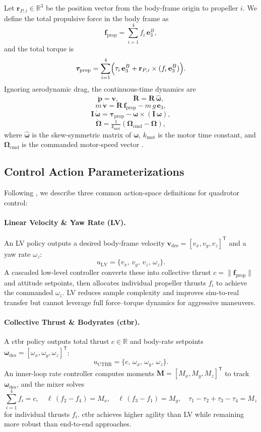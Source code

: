 Let \(\mathbf{r}_{P,i}\in \mathbb{R}^{3}\) be the position vector from the body-frame origin to propeller \(i\). We define the total propulsive force in the body frame as
\[
\mathbf{f}_{\mathrm{prop}} = \sum_{i=1}^4 f_i\,\mathbf{e}_3^B,
\]
and the total torque is
\[
\boldsymbol{\tau}_{\mathrm{prop}} = \sum_{i=1}^4 \Bigl(\tau_i\,\mathbf{e}_3^B + \mathbf{r}_{P,i}\times(f_i\,\mathbf{e}_3^B)\Bigr).
\]
Ignoring aerodynamic drag, the continuous-time dynamics are
\[
\dot{\mathbf{p}} = \mathbf{v}, 
\qquad
\dot{\mathbf{R}} = \mathbf{R}\,\widehat{\boldsymbol{\omega}},
\]
\[
m\,\dot{\mathbf{v}} = \mathbf{R}\,\mathbf{f}_{\mathrm{prop}} - m\,g\,\mathbf{e}_3,
\]
\[
\mathbf{I}\,\dot{\boldsymbol{\omega}} = \boldsymbol{\tau}_{\mathrm{prop}} - \boldsymbol{\omega} \times (\mathbf{I}\,\boldsymbol{\omega}),
\]
\[
\dot{\boldsymbol{\Omega}} = \tfrac{1}{k_{\mathrm{mot}}}(\boldsymbol{\Omega}_{\mathrm{cmd}} - \boldsymbol{\Omega}),
\]
where \(\widehat{\boldsymbol{\omega}}\) is the skew-symmetric matrix of \(\boldsymbol{\omega}\), \(k_{\mathrm{mot}}\) is the motor time constant, and \(\boldsymbol{\Omega}_{\mathrm{cmd}}\) is the commanded motor-speed vector \cite{kaufmann_benchmark_2022}.

\subsection{Control Action Parameterizations}
\label{sec:quadrotor_actions}
Following \cite{kaufmann_benchmark_2022}, we describe three common action-space definitions for quadrotor control:

\paragraph{Linear Velocity \& Yaw Rate (LV).}  
An LV policy outputs a desired body-frame velocity \(\mathbf{v}_{\mathrm{des}}=[v_x,v_y,v_z]^\mathsf{T}\) and a yaw rate \(\omega_z\):
\[
u_{\mathrm{LV}} = \{v_x,\,v_y,\,v_z,\,\omega_z\}.
\]
A cascaded low-level controller converts these into collective thrust \(c=\|\mathbf{f}_{\mathrm{prop}}\|\) and attitude setpoints, then allocates individual propeller thrusts \(f_i\) to achieve the commanded \(\omega_z\). LV reduces sample complexity and improves sim-to-real transfer but cannot leverage full force–torque dynamics for aggressive maneuvers.

\paragraph{Collective Thrust \& Bodyrates (\gls{ctbr}).}  
A \gls{ctbr} policy outputs total thrust \(c\in\mathbb{R}\) and body-rate setpoints \(\boldsymbol{\omega}_{\mathrm{des}}=[\omega_x,\omega_y,\omega_z]^\mathsf{T}\):
\[
u_{\mathrm{CTBR}} = \{c,\,\omega_x,\,\omega_y,\,\omega_z\}.
\]
An inner-loop rate controller computes moments \(\mathbf{M}=[M_x,M_y,M_z]^\mathsf{T}\) to track \(\boldsymbol{\omega}_{\mathrm{des}}\), and the mixer solves
\[
\sum_{i=1}^4 f_i = c, 
\quad
\ell\,(f_2 - f_4) = M_x, 
\quad
\ell\,(f_3 - f_1) = M_y, 
\quad
\tau_1 - \tau_2 + \tau_3 - \tau_4 = M_z
\]
for individual thrusts \(f_i\). \gls{ctbr} achieves higher agility than LV while remaining more robust than end-to-end approaches.

